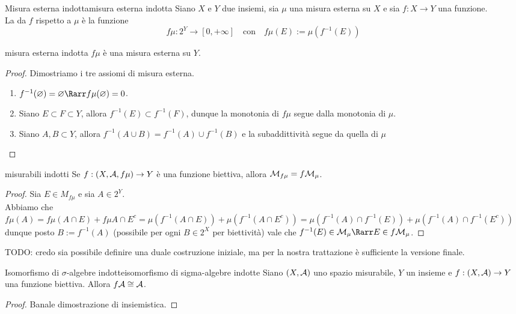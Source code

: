 \documentclass{article}
\begin{document}
\begin{definition}{Misura esterna indotta}{misura esterna indotta}
    Siano $X$ e $Y$ due insiemi, sia $\mu$ una misura esterna su $X$ e sia $f:X\to Y$ una funzione.\\
    La  da $f$ rispetto a $\mu$ è la funzione
    \[f\mu : 2^Y \to [0,+\infty] \quad \text{con} \quad f\mu(E):= \mu(f^{-1}(E)) \]
\end{definition}
\begin{proposition}{}{misura esterna indotta}
    $f\mu$ è una misura esterna su $Y$.
    \begin{proof}
        Dimostriamo i tre assiomi di misura esterna.\begin{enumerate}
            \item $f^{-1}(\varnothing) = \varnothing \Rarr f\mu(\varnothing) = 0$.
            \item Siano $E \subset F \subset Y$, allora $f^{-1}(E)\subset f^{-1}(F)$, dunque la monotonia di $f\mu$ segue dalla monotonia di $\mu$.
            \item Siano $A,B \subset Y$, allora $f^{-1}(A\cup B)= f^{-1}(A) \cup f^{-1}(B) $ e la subaddittività segue da quella di $\mu$
        \end{enumerate}
    \end{proof}
\end{proposition}
\begin{proposition}{}{misurabili indotti}
    Se $f: (X,\mathcal{A},f\mu)\to Y$ è una funzione biettiva, allora $\mathcal{M}_{f\mu} = f \mathcal{M}_\mu$.
    \begin{proof}
        Sia $E \in M_{f\mu}$ e sia $A \in 2^Y$.\\
        Abbiamo che $f\mu(A) = f\mu(A\cap E)+ f\mu A\cap E^c = \mu(f^{-1}(A \cap E)) + \mu(f^{-1}(A\cap E^c)) = \mu(f^{-1}(A)\cap f^{-1}(E)) + \mu(f^{-1}(A)\cap f^{-1}(E^c))$ dunque posto $B:= f^{-1}(A)$ (possibile per ogni $B \in 2^X$ per biettività) vale che $f^{-1}(E) \in \M_\mu \Rarr E \in f\M_\mu$.
    \end{proof}
\end{proposition}

TODO: credo sia possibile definire una duale costruzione iniziale, ma per la nostra trattazione è sufficiente la versione finale.

\begin{lemma}{Isomorfismo di $\sigma$-algebre indotte}{isomorfismo di sigma-algebre indotte}
    Siano $(X,\mathcal{A})$ uno spazio misurabile, $Y$ un insieme e $f: (X,\mathcal{A})\to Y$ una funzione biettiva. Allora $f\mathcal{A} \cong \mathcal{A}$.
    \begin{proof}
        Banale dimostrazione di insiemistica.
    \end{proof}
\end{lemma}
\end{document}
